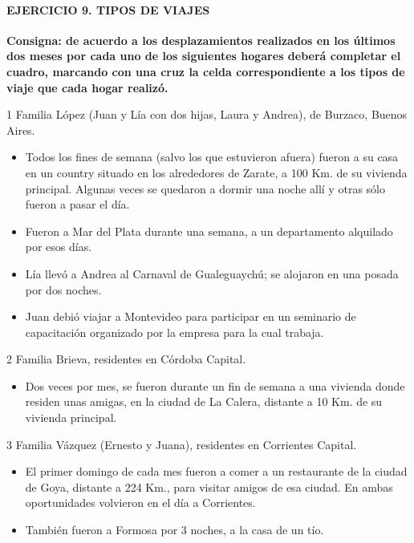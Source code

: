 \documentclass[
  openany]{book}
\providecommand{\tightlist}{%
  \setlength{\itemsep}{0pt}\setlength{\parskip}{0pt}}
\begin{document}
\hypertarget{ejercicio-9.-tipos-de-viajes-1}{%
\paragraph{\texorpdfstring{\textbf{EJERCICIO 9. TIPOS DE VIAJES}}{EJERCICIO 9. TIPOS DE VIAJES}}\label{ejercicio-9.-tipos-de-viajes-1}}

\textbf{Consigna: de acuerdo a los desplazamientos realizados en los últimos dos meses por cada uno de los siguientes hogares deberá completar el cuadro, marcando con una cruz la celda correspondiente a los tipos de viaje que cada hogar realizó.}

1 Familia López (Juan y Lía con dos hijas, Laura y Andrea), de Burzaco, Buenos Aires.

\begin{itemize}
\item
  Todos los fines de semana (salvo los que estuvieron afuera) fueron a su casa en un country situado en los alrededores de Zarate, a 100 Km. de su vivienda principal. Algunas veces se quedaron a dormir una noche allí y otras sólo fueron a pasar el día.
\item
  Fueron a Mar del Plata durante una semana, a un departamento alquilado por esos días.
\item
  Lía llevó a Andrea al Carnaval de Gualeguaychú; se alojaron en una posada por dos noches.
\item
  Juan debió viajar a Montevideo para participar en un seminario de capacitación organizado por la empresa para la cual trabaja.
\end{itemize}

2 Familia Brieva, residentes en Córdoba Capital.

\begin{itemize}
\tightlist
\item
  Dos veces por mes, se fueron durante un fin de semana a una vivienda donde residen unas amigas, en la ciudad de La Calera, distante a 10 Km. de su vivienda principal.
\end{itemize}

3 Familia Vázquez (Ernesto y Juana), residentes en Corrientes Capital.

\begin{itemize}
\item
  El primer domingo de cada mes fueron a comer a un restaurante de la ciudad de Goya, distante a 224 Km., para visitar amigos de esa ciudad. En ambas oportunidades volvieron en el día a Corrientes.
\item
  También fueron a Formosa por 3 noches, a la casa de un tío.\\
\end{itemize}
\end{document}
